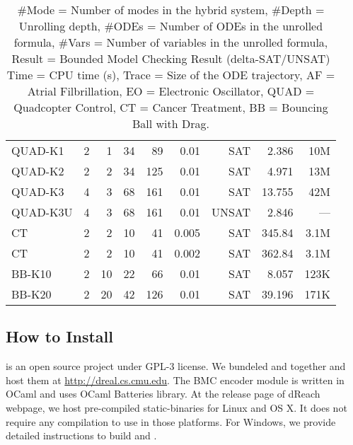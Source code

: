 {\begin{table}[!th]
\begin{tabular}{l|r|r|r|r|r|r|r|r}
    \hline
    \hline
    QUAD-K1  & 2   & 1          & 34     & 89      & 0.01      & SAT & 2.386 &  10M \\
    QUAD-K2  & 2   & 2          & 34     & 125     & 0.01      & SAT & 4.971 &  13M \\
    QUAD-K3  & 4   & 3          & 68     & 161     & 0.01      & SAT & 13.755 & 42M \\
    QUAD-K3U & 4   & 3          & 68     & 161     & 0.01      & UNSAT & 2.846 & --- \\
    \hline
    \hline
    CT       & 2   & 2         & 10      & 41      & 0.005     & SAT & 345.84 & 3.1M\\
    CT       & 2   & 2         & 10      & 41      & 0.002     & SAT & 362.84 & 3.1M\\
    \hline
    \hline
    BB-K10 & 2     & 10       & 22     & 66      & 0.01        & SAT & 8.057     & 123K  \\
    BB-K20 & 2     & 20       & 42     & 126     & 0.01        & SAT & 39.196    & 171K  \\
    \hline
    \hline
  \end{tabular}
  \caption{\small
    \#Mode = Number of modes in the hybrid system,
    \#Depth = Unrolling depth,
    \#ODEs = Number of ODEs in the unrolled formula,
    \#Vars = Number of variables in the unrolled formula,
    Result = Bounded Model Checking Result (delta-SAT/UNSAT)
    Time = CPU time (s),
    Trace = Size of the ODE trajectory,
    AF = Atrial Filbrillation,
    EO = Electronic Oscillator,
    QUAD = Quadcopter Control,
    CT = Cancer Treatment,
    BB = Bouncing Ball with Drag.
}\label{tbl:exp}
\end{table}

\subsection{How to Install}
\dReach{} is an open source project under GPL-3 license. We bundeled
\dReal{} and \dReach{} together and host them at
\url{http://dreal.cs.cmu.edu}. The BMC encoder module is written in
OCaml and uses OCaml Batteries library. At the release page of dReach
webpage, we host pre-compiled static-binaries for Linux and OS X. It
does not require any compilation to use \dReach{} in those
platforms. For Windows, we provide detailed instructions to build
\dReach{} and \dReal{}.

}
